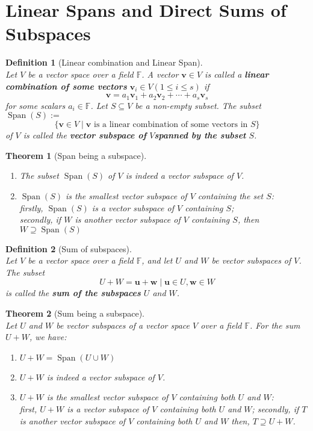 \documentclass[12pt]{article}
\newtheorem{definition}{Definition}[section]
\newtheorem{theorem}{Theorem}[section]
\theoremstyle{definition}
\DeclareMathOperator{\spn}{Span}
\begin{document}
\section{Linear Spans and Direct Sums of Subspaces}
\begin{definition}[Linear combination and Linear Span]
\hfill\\\normalfont Let $V$ be a vector space over a field $\mathbb{F}$. A vector $\mathbf{v}\in V$ is called a \textbf{linear combination of some vectors} $\mathbf{v}_i\in V(1\leq i\leq s)$ if
\[
\mathbf{v} = a_1\mathbf{v}_1+a_2\mathbf{v}_2+\cdots + a_s\mathbf{v}_s
\]
for some scalars $a_i\in\mathbb{F}$.
Let $S\subseteq V$ be a non-empty subset. The subset $\spn(S):=$
\[
\{\mathbf{v}\in V\mid \mathbf{v}\text{ is a linear combination of some vectors in }S\}
\]
of $V$ is called the \textbf{vector subspace of }$V$\textbf{spanned by the subset }$S$.
\end{definition}
\begin{theorem}[Span being a subspace]
\hfill\normalfont
\begin{enumerate}[label=(\roman*)]
\item The subset $\spn(S)$ of $V$ is indeed a vector subspace of $V$.
\item $\spn(S)$ is the smallest vector subspace of $V$ containing the set $S$:\\
firstly, $\spn(S)$ is a vector subspace of $V$ containing $S$;\\
secondly, if $W$ is another vector subspace of $V$ containing $S$, then $W\supseteq\spn(S)$
\end{enumerate}
\end{theorem}
\begin{definition}[Sum of subspaces]
\hfill\\
\normalfont Let $V$ be a vector space over a field $\mathbb{F}$, and let $U$ and $W$ be vector subspaces of $V$. The subset
\[
U+W={\mathbf{u}+\mathbf{w}\mid \mathbf{u}\in U, \mathbf{w}\in W}
\]
is called the \textbf{sum of the subspaces }$U$ and $W$. 
\end{definition}
\begin{theorem}[Sum being a subspace] 
\hfill\\\normalfont Let $U$ and $W$ be vector subspaces of a vector space $V$ over a field $\mathbb{F}$. For the sum $U+W$, we have:
\begin{enumerate}
\item $U+W=\spn(U\cup W)$
\item $U+W$ is indeed a vector subspace of $V$.
\item $U+W$ is the smallest vector subspace of $V$ containing both $U$ and $W$:\\
first, $U+W$ is a vector subspace of $V$ containing both $U$ and $W$;
secondly, if $T$ is another vector subspace of $V$ containing both $U$ and $W$ then, $T\supseteq U+W$.
\end{enumerate}
\end{theorem}
\end{document}
